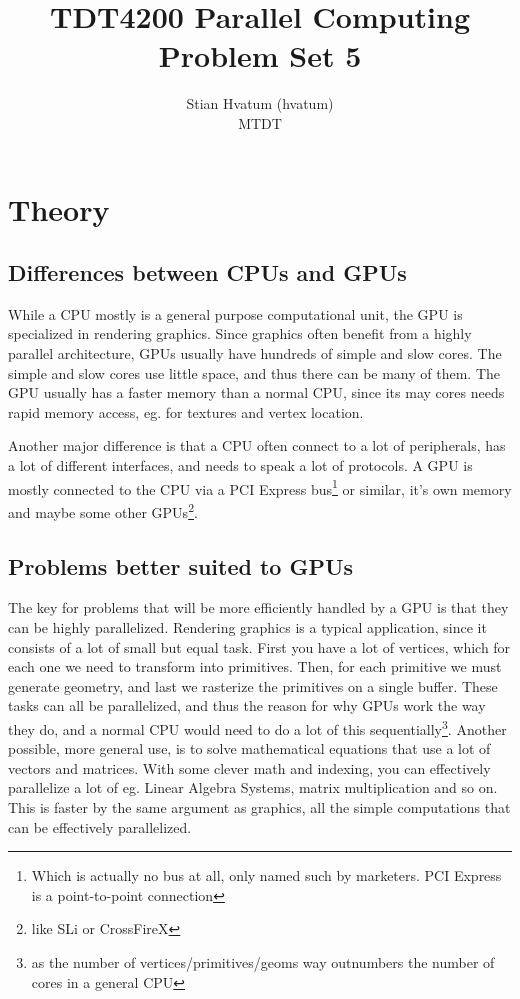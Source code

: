 \documentclass[english,a4paper,numbers=noenddot]{article}
\title{TDT4200 Parallel Computing\\
\Huge Problem Set 5}
\author{Stian Hvatum (hvatum)\\MTDT}
\begin{document}
\maketitle
\tableofcontents
\section{Theory}
\subsection{Differences between CPUs and GPUs}
While a CPU mostly is a general purpose computational unit, the GPU is specialized in rendering graphics. Since graphics often benefit from a highly parallel architecture, GPUs usually have hundreds of simple and slow cores. The simple and slow cores use little space, and thus there can be many of them. The GPU usually has a faster memory than a normal CPU, since its may cores needs rapid memory access, eg. for textures and vertex location.

Another major difference is that a CPU often connect to a lot of peripherals, has a lot of different interfaces, and needs to speak a lot of protocols. A GPU is mostly connected to the CPU via a PCI Express bus\footnote{Which is actually no bus at all, only named such by marketers. PCI Express is a point-to-point connection} or similar, it's own memory and maybe some other GPUs\footnote{like SLi or CrossFireX}.

\subsection{Problems better suited to GPUs}
The key for problems that will be more efficiently handled by a GPU is that they can be highly parallelized. Rendering graphics is a typical application, since it consists of a lot of small but equal task. First you have a lot of vertices, which for each one we need to transform into primitives. Then, for each primitive we must generate geometry, and last we rasterize the primitives on a single buffer. These tasks can all be parallelized, and thus the reason for why GPUs work the way they do, and a normal CPU would need to do a lot of this sequentially\footnote{as the number of vertices/primitives/geoms way outnumbers the number of cores in a general CPU}.
Another possible, more general use, is to solve mathematical equations that use a lot of vectors and matrices. With some clever math and indexing, you can effectively parallelize a lot of eg. Linear Algebra Systems, matrix multiplication and so on. This is faster by the same argument as graphics, all the simple computations that can be effectively parallelized.
\end{document}
